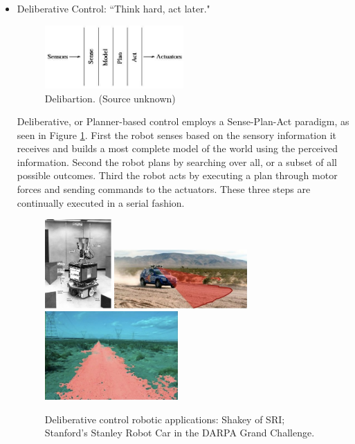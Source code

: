 \begin{itemize}
\item Deliberative Control: ``Think hard, act later."

\begin{figure}[!h]
\centering
\includegraphics[width=0.5\textwidth]{figures/5_deliberation.jpg}
\caption{Delibartion. (Source unknown)}
\label{fig:5_deliberation}
\end{figure}

Deliberative, or Planner-based control employs a Sense-Plan-Act paradigm, as seen in Figure \ref{fig:5_deliberation}. First the robot senses based on the sensory information it receives and builds a most complete model of the world using the perceived information. Second the robot plans by searching over all, or a subset of all possible outcomes. Third the robot acts by executing a plan through motor forces and sending commands to the actuators. These three steps are continually executed in a serial fashion. 

\begin{figure}[!h]
\centerline{
\mbox{\includegraphics[width=1.0in]{figures/5_shakey.jpg}}
\mbox{\includegraphics[width=2.0in]{figures/5_stanley.jpg}}
\mbox{\includegraphics[width=2.0in]{figures/5_path.jpg}}
}
\caption{Deliberative control robotic applications: Shakey of SRI; Stanford's Stanley Robot Car in the DARPA Grand Challenge.}
\label{fig:5_shakey_stanley}
\end{figure}


\end{itemize}
